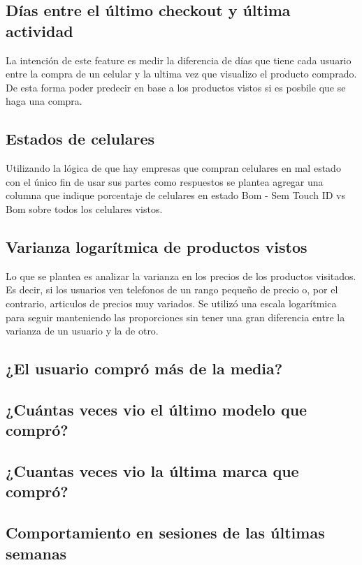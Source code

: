 \documentclass[a4paper]{article}
\begin{document}
\subsection{Días entre el último checkout y última actividad}
La intención de este feature es medir la diferencia de días que tiene cada usuario entre la compra de un celular y la ultima vez que visualizo el producto comprado. De esta forma poder predecir en base a los productos vistos si es posbile que se haga una compra.

\subsection{Estados de celulares}
Utilizando la lógica de que hay empresas que compran celulares en mal estado con el único fin de usar sus partes como respuestos se plantea agregar una columna que indique porcentaje de celulares en estado Bom - Sem Touch ID vs Bom sobre todos los celulares vistos.

\subsection{Varianza logarítmica de productos vistos}
Lo que se plantea es analizar la varianza en los precios de los productos visitados. Es decir, si los usuarios ven telefonos de un rango pequeño de precio o, por el contrario, articulos de precios muy variados. Se utilizó una escala logarítmica para seguir manteniendo las proporciones sin tener una gran diferencia entre la varianza de un usuario y la de otro.
\subsection{¿El usuario compró más de la media?}

\subsection{¿Cuántas veces vio el último modelo que compró?}

\subsection{¿Cuantas veces vio la última marca que compró?}

\subsection{Comportamiento en sesiones de las últimas semanas}
\end{document}
